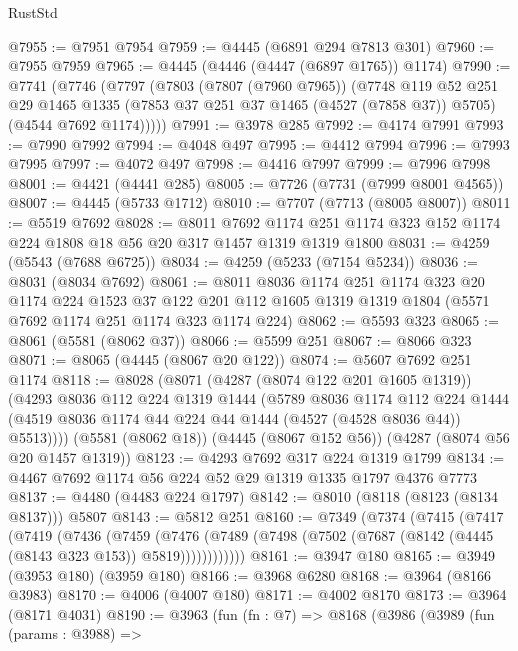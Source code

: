 \begin{lexlean}{RustStd}
\begin{coremodule}
{\begin{coremodule}
{{{{{{{{{{{{{{{{{{{{{{{{{{{{{{{{{{{{{{@7955 := @7951 @7954
@7959 := @4445 (@6891 @294 @7813 @301)
@7960 := @7955 @7959
@7965 := @4445 (@4446 (@4447 (@6897 @1765)) @1174)
@7990 := @7741
    (@7746
      (@7797
        (@7803
          (@7807 (@7960 @7965))
          (@7748
            @119
            @52
            @251
            @29
            @1465
            @1335
            (@7853 @37 @251 @37 @1465 (@4527 (@7858 @37)) @5705)
            (@4544 @7692 @1174)))))
@7991 := @3978 @285
@7992 := @4174 @7991
@7993 := @7990 @7992
@7994 := @4048 @497
@7995 := @4412 @7994
@7996 := @7993 @7995
@7997 := @4072 @497
@7998 := @4416 @7997
@7999 := @7996 @7998
@8001 := @4421 (@4441 @285)
@8005 := @7726 (@7731 (@7999 @8001 @4565))
@8007 := @4445 (@5733 @1712)
@8010 := @7707 (@7713 (@8005 @8007))
@8011 := @5519 @7692
@8028 := @8011
    @7692
    @1174
    @251
    @1174
    @323
    @152
    @1174
    @224
    @1808
    @18
    @56
    @20
    @317
    @1457
    @1319
    @1319
    @1800
@8031 := @4259 (@5543 (@7688 @6725))
@8034 := @4259 (@5233 (@7154 @5234))
@8036 := @8031 (@8034 @7692)
@8061 := @8011
    @8036
    @1174
    @251
    @1174
    @323
    @20
    @1174
    @224
    @1523
    @37
    @122
    @201
    @112
    @1605
    @1319
    @1319
    @1804
    (@5571 @7692 @1174 @251 @1174 @323 @1174 @224)
@8062 := @5593 @323
@8065 := @8061 (@5581 (@8062 @37))
@8066 := @5599 @251
@8067 := @8066 @323
@8071 := @8065 (@4445 (@8067 @20 @122))
@8074 := @5607 @7692 @251 @1174
@8118 := @8028
    (@8071
      (@4287 (@8074 @122 @201 @1605 @1319))
      (@4293
        @8036
        @112
        @224
        @1319
        @1444
        (@5789
          @8036
          @1174
          @112
          @224
          @1444
          (@4519 @8036 @1174 @44 @224 @44 @1444 (@4527 (@4528 @8036 @44)) @5513))))
    (@5581 (@8062 @18))
    (@4445 (@8067 @152 @56))
    (@4287 (@8074 @56 @20 @1457 @1319))
@8123 := @4293 @7692 @317 @224 @1319 @1799
@8134 := @4467 @7692 @1174 @56 @224 @52 @29 @1319 @1335 @1797 @4376 @7773
@8137 := @4480 (@4483 @224 @1797)
@8142 := @8010 (@8118 (@8123 (@8134 @8137))) @5807
@8143 := @5812 @251
@8160 := @7349
    (@7374
      (@7415
        (@7417
          (@7419
            (@7436
              (@7459
                (@7476
                  (@7489 (@7498 (@7502 (@7687 (@8142 (@4445 (@8143 @323 @153)) @5819))))))))))))
@8161 := @3947 @180
@8165 := @3949 (@3953 @180) (@3959 @180)
@8166 := @3968 @6280
@8168 := @3964 (@8166 @3983)
@8170 := @4006 (@4007 @180)
@8171 := @4002 @8170
@8173 := @3964 (@8171 @4031)
@8190 := @3963
    (fun (fn : @7) =>
    @8168
      (@3986
        (@3989
          (fun (params : @3988) =>
}}}}}}}}}}}}}}}}}}}}}}}}}}}}}}}}}}}}}}
\end{coremodule}}
\end{coremodule}
\end{lexlean}
